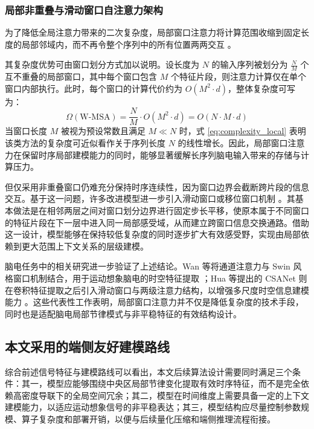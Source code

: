 \subsubsection{局部非重叠与滑动窗口自注意力架构}

为了降低全局注意力带来的二次复杂度，局部窗口注意力将计算范围收缩到固定长度的局部邻域内，而不再令整个序列中的所有位置两两交互 \cite{liu2021swin}。

其复杂度优势可由窗口划分方式加以说明。设长度为 $N$ 的输入序列被划分为 $\frac{N}{M}$ 个互不重叠的局部窗口，其中每个窗口包含 $M$ 个特征片段，则注意力计算仅在单个窗口内部执行。此时，每个窗口的计算代价约为 $O(M^2 \cdot d)$，整体复杂度可写为：
\begin{equation} \label{eq:complexity_local}
\Omega(\text{W-MSA}) = \frac{N}{M} \cdot O(M^2 \cdot d) = O(N \cdot M \cdot d)
\end{equation}
当窗口长度 $M$ 被视为预设常数且满足 $M \ll N$ 时，式 \eqref{eq:complexity_local} 表明该类方法的复杂度可近似看作关于序列长度 $N$ 的线性增长。因此，局部窗口注意力在保留时序局部建模能力的同时，能够显著缓解长序列脑电输入带来的存储与计算压力。

但仅采用非重叠窗口仍难充分保持时序连续性，因为窗口边界会截断跨片段的信息交互。基于这一问题，许多改进模型进一步引入滑动窗口或移位窗口机制 \cite{liu2021swin, hua2023improved}。其基本做法是在相邻两层之间对窗口划分边界进行固定步长平移，使原本属于不同窗口的特征片段在下一层中进入同一局部感受域，从而建立跨窗口信息交换通路。借助这一设计，模型能够在保持较低复杂度的同时逐步扩大有效感受野，实现由局部依赖到更大范围上下文关系的层级建模。

脑电任务中的相关研究进一步验证了上述结论。Wan 等将通道注意力与 Swin 风格窗口机制结合，用于运动想象脑电的时空特征提取 \cite{wan2023novel}；Hua 等提出的 CSANet 则在卷积特征提取之后引入滑动窗口与两级注意力结构，以增强多尺度时空信息建模能力 \cite{hua2023improved}。这些代表性工作表明，局部窗口注意力并不仅是降低复杂度的技术手段，同时也是适配脑电局部节律模式与非平稳特征的有效结构设计。

\subsection{本文采用的端侧友好建模路线}

综合前述信号特征与建模路线可以看出，本文后续算法设计需要同时满足三个条件：其一，模型应能够围绕中央区局部节律变化提取有效时序特征，而不是完全依赖高密度导联下的全局空间冗余；其二，模型在时间维度上需要具备一定的上下文建模能力，以适应运动想象信号的非平稳表达；其三，模型结构应尽量控制参数规模、算子复杂度和部署开销，以便与后续量化压缩和端侧推理流程衔接。

